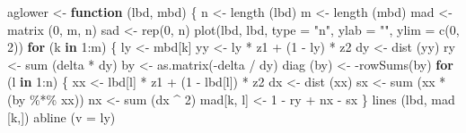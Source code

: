 \documentclass[
  12pt,
  letterpaper,
  DIV=11,
  numbers=noendperiod]{scrreprt}
\newenvironment{Shaded}{\begin{snugshade}}{\end{snugshade}}
\newcommand{\AttributeTok}[1]{\textcolor[rgb]{0.40,0.45,0.13}{#1}}
\newcommand{\ControlFlowTok}[1]{\textcolor[rgb]{0.00,0.23,0.31}{\textbf{#1}}}
\newcommand{\DecValTok}[1]{\textcolor[rgb]{0.68,0.00,0.00}{#1}}
\newcommand{\FunctionTok}[1]{\textcolor[rgb]{0.28,0.35,0.67}{#1}}
\newcommand{\NormalTok}[1]{\textcolor[rgb]{0.00,0.23,0.31}{#1}}
\newcommand{\OtherTok}[1]{\textcolor[rgb]{0.00,0.23,0.31}{#1}}
\newcommand{\SpecialCharTok}[1]{\textcolor[rgb]{0.37,0.37,0.37}{#1}}
\newcommand{\StringTok}[1]{\textcolor[rgb]{0.13,0.47,0.30}{#1}}
\theoremstyle{remark}
\begin{document}
\begin{Shaded}
\begin{Highlighting}[]
\NormalTok{aglower }\OtherTok{\textless{}{-}} \ControlFlowTok{function}\NormalTok{ (lbd, mbd) \{}
\NormalTok{  n }\OtherTok{\textless{}{-}} \FunctionTok{length}\NormalTok{ (lbd)}
\NormalTok{  m }\OtherTok{\textless{}{-}} \FunctionTok{length}\NormalTok{ (mbd)}
\NormalTok{  mad }\OtherTok{\textless{}{-}} \FunctionTok{matrix}\NormalTok{ (}\DecValTok{0}\NormalTok{, m, n)}
\NormalTok{  sad }\OtherTok{\textless{}{-}} \FunctionTok{rep}\NormalTok{(}\DecValTok{0}\NormalTok{, n)}
  \FunctionTok{plot}\NormalTok{(lbd,}
\NormalTok{       lbd,}
       \AttributeTok{type =} \StringTok{"n"}\NormalTok{,}
       \AttributeTok{ylab =} \StringTok{""}\NormalTok{,}
       \AttributeTok{ylim =} \FunctionTok{c}\NormalTok{(}\DecValTok{0}\NormalTok{, }\DecValTok{2}\NormalTok{))}
  \ControlFlowTok{for}\NormalTok{ (k }\ControlFlowTok{in} \DecValTok{1}\SpecialCharTok{:}\NormalTok{m) \{}
\NormalTok{    ly }\OtherTok{\textless{}{-}}\NormalTok{ mbd[k]}
\NormalTok{    yy }\OtherTok{\textless{}{-}}\NormalTok{ ly }\SpecialCharTok{*}\NormalTok{ z1 }\SpecialCharTok{+}\NormalTok{ (}\DecValTok{1} \SpecialCharTok{{-}}\NormalTok{ ly) }\SpecialCharTok{*}\NormalTok{ z2}
\NormalTok{    dy }\OtherTok{\textless{}{-}} \FunctionTok{dist}\NormalTok{ (yy)}
\NormalTok{    ry }\OtherTok{\textless{}{-}} \FunctionTok{sum}\NormalTok{ (delta }\SpecialCharTok{*}\NormalTok{ dy)}
\NormalTok{    by }\OtherTok{\textless{}{-}} \FunctionTok{as.matrix}\NormalTok{(}\SpecialCharTok{{-}}\NormalTok{delta }\SpecialCharTok{/}\NormalTok{ dy)}
    \FunctionTok{diag}\NormalTok{ (by) }\OtherTok{\textless{}{-}} \SpecialCharTok{{-}}\FunctionTok{rowSums}\NormalTok{(by)}
    \ControlFlowTok{for}\NormalTok{ (l }\ControlFlowTok{in} \DecValTok{1}\SpecialCharTok{:}\NormalTok{n) \{}
\NormalTok{      xx }\OtherTok{\textless{}{-}}\NormalTok{ lbd[l] }\SpecialCharTok{*}\NormalTok{ z1 }\SpecialCharTok{+}\NormalTok{ (}\DecValTok{1} \SpecialCharTok{{-}}\NormalTok{ lbd[l]) }\SpecialCharTok{*}\NormalTok{ z2}
\NormalTok{      dx }\OtherTok{\textless{}{-}} \FunctionTok{dist}\NormalTok{ (xx)}
\NormalTok{      sx }\OtherTok{\textless{}{-}} \FunctionTok{sum}\NormalTok{ (xx }\SpecialCharTok{*}\NormalTok{ (by }\SpecialCharTok{\%*\%}\NormalTok{ xx))}
\NormalTok{      nx }\OtherTok{\textless{}{-}} \FunctionTok{sum}\NormalTok{ (dx }\SpecialCharTok{\^{}} \DecValTok{2}\NormalTok{)}
\NormalTok{      mad[k, l] }\OtherTok{\textless{}{-}} \DecValTok{1} \SpecialCharTok{{-}}\NormalTok{ ry }\SpecialCharTok{+}\NormalTok{ nx }\SpecialCharTok{{-}}\NormalTok{ sx}
\NormalTok{    \}}
    \FunctionTok{lines}\NormalTok{ (lbd, mad [k,])}
    \FunctionTok{abline}\NormalTok{ (}\AttributeTok{v =}\NormalTok{ ly)}

\end{Highlighting}
\end{Shaded}
\end{document}
